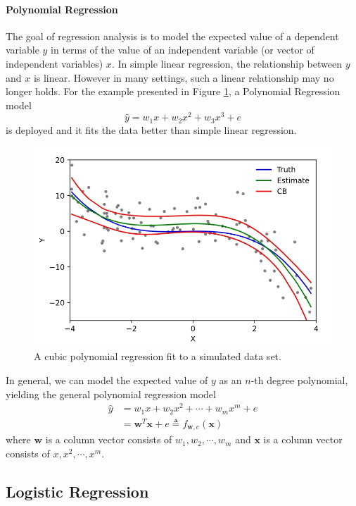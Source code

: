 \documentclass[12pt, twoside]{article}
\begin{document}
\begin{multicols*}{2}
			\paragraph{Polynomial Regression}
			The goal of regression analysis is to model the expected value of a dependent variable $y$ in terms of the value of an independent variable (or vector of independent variables) $x$. In simple linear regression, the relationship between $y$ and $x$ is linear. However in many settings, such a linear relationship may no longer holds.\cite{STIGLER1974431} For the example presented in Figure \ref{poly-eg}, a Polynomial Regression model
			$$ \hat{y}=w_1x+w_2x^2+w_3x^3+e $$
			is deployed and it fits the data better than simple linear regression.
			\begin{figure}[H]
				\centering
				\includegraphics[width=\columnwidth]{Polyreg_scheffe}
				\caption{A cubic polynomial regression fit to a simulated data set.\cite{enwiki:1175712788}}
				\label{poly-eg}
			\end{figure}
			In general, we can model the expected value of $y$ as an $n$-th degree polynomial, yielding the general polynomial regression model
			\begin{align*}
				\hat{y} &= w_1x+w_2x^2+\cdots+w_mx^m+e\\
						&= \mathbf{w}^T\mathbf{x}+e\triangleq f_{\mathbf{w},e}(\mathbf{x})
			\end{align*}
			where $\mathbf{w}$ is a column vector consists of $w_1,w_2,\cdots,w_m$ and $\mathbf{x}$ is a column vector consists of $x,x^2,\cdots,x^m$.
			
	\subsection{Logistic Regression}

\end{multicols*}
\end{document}
